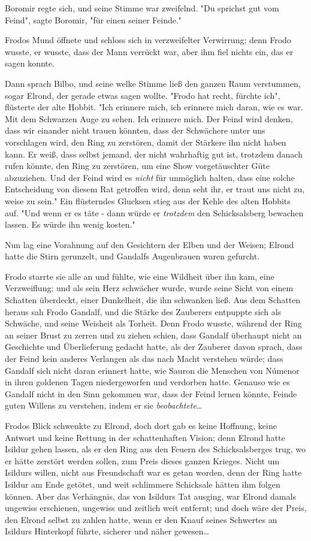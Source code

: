 {Boromir regte sich, und seine Stimme war zweifelnd. "Du sprichst gut vom Feind", sagte Boromir, "für einen seiner Feinde."

Frodos Mund öffnete und schloss sich in verzweifelter Verwirrung; denn Frodo wusste, er wusste, dass der Mann verrückt war, aber ihm fiel nichts ein, das er sagen konnte.

Dann sprach Bilbo, und seine welke Stimme ließ den ganzen Raum verstummen, sogar Elrond, der gerade etwas sagen wollte. "Frodo hat recht, fürchte ich", flüsterte der alte Hobbit. "Ich erinnere mich, ich erinnere mich daran, wie es war. Mit dem Schwarzen Auge zu sehen. Ich erinnere mich. Der Feind wird denken, dass wir einander nicht trauen könnten, dass der Schwächere unter uns vorschlagen wird, den Ring zu zerstören, damit der Stärkere ihn nicht haben kann. Er weiß, dass selbst jemand, der nicht wahrhaftig gut ist, trotzdem danach rufen könnte, den Ring zu zerstören, um eine Show vorgetäuschter Güte abzuziehen. Und der Feind wird es \emph{nicht} für unmöglich halten, dass eine solche Entscheidung von diesem Rat getroffen wird, denn seht ihr, er traut uns nicht zu, weise zu sein." Ein flüsterndes Glucksen stieg aus der Kehle des alten Hobbits auf. "Und wenn er es täte - dann würde er \emph{trotzdem} den Schicksalsberg bewachen lassen. Es würde ihn wenig kosten."

Nun lag eine Vorahnung auf den Gesichtern der Elben und der Weisen; Elrond hatte die Stirn gerunzelt, und Gandalfs Augenbrauen waren gefurcht.

Frodo starrte sie alle an und fühlte, wie eine Wildheit über ihn kam, eine Verzweiflung; und als sein Herz schwächer wurde, wurde seine Sicht von einem Schatten überdeckt, einer Dunkelheit, die ihn schwanken ließ. Aus dem Schatten heraus sah Frodo Gandalf, und die Stärke des Zauberers entpuppte sich als Schwäche, und seine Weisheit als Torheit. Denn Frodo wusste, während der Ring an seiner Brust zu zerren und zu ziehen schien, dass Gandalf überhaupt nicht an Geschichte und Überlieferung gedacht hatte, als der Zauberer davon sprach, dass der Feind kein anderes Verlangen als das nach Macht verstehen würde; dass Gandalf sich nicht daran erinnert hatte, wie Sauron die Menschen von Númenor in ihren goldenen Tagen niedergeworfen und verdorben hatte. Genauso wie es Gandalf nicht in den Sinn gekommen war, dass der Feind lernen könnte, Feinde guten Willens zu verstehen, indem er sie \emph{beobachtete}…

Frodos Blick schwenkte zu Elrond, doch dort gab es keine Hoffnung, keine Antwort und keine Rettung in der schattenhaften Vision; denn Elrond hatte Isildur gehen lassen, als er den Ring aus den Feuern des Schicksalsberges trug, wo er hätte zerstört werden sollen, zum Preis dieses ganzen Krieges. Nicht um Isildurs willen, nicht aus Freundschaft war es getan worden, denn der Ring hatte Isildur am Ende getötet, und weit schlimmere Schicksale hätten ihm folgen können. Aber das Verhängnis, das von Isildurs Tat ausging, war Elrond damals ungewiss erschienen, ungewiss und zeitlich weit entfernt; und doch wäre der Preis, den Elrond selbst zu zahlen hatte, wenn er den Knauf seines Schwertes an Isildurs Hinterkopf führte, sicherer und näher gewesen…

}
